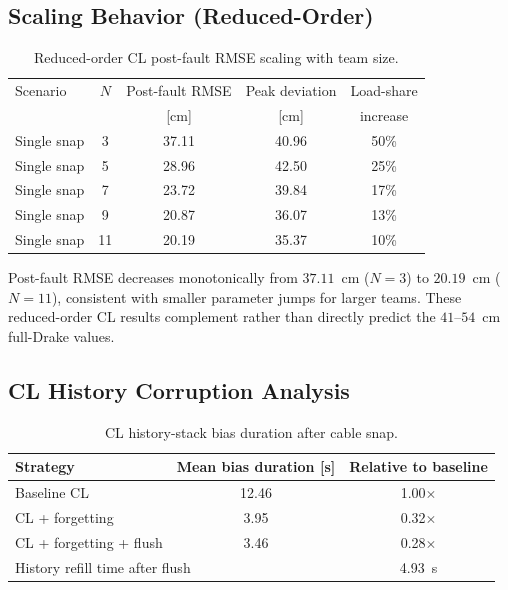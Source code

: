 
\subsection{Scaling Behavior (Reduced-Order)}
\label{supp:scaling}

\begin{table}[t]
\centering
\caption{Reduced-order CL post-fault RMSE scaling with team size.}
\label{tab:scaling}
\begin{tabular}{lcccc}
\toprule
Scenario & $N$ & Post-fault RMSE & Peak deviation & Load-share \\
         &     & [cm]            & [cm]           & increase   \\
\midrule
Single snap & 3  & 37.11 & 40.96 & 50\% \\
Single snap & 5  & 28.96 & 42.50 & 25\% \\
Single snap & 7  & 23.72 & 39.84 & 17\% \\
Single snap & 9  & 20.87 & 36.07 & 13\% \\
Single snap & 11 & 20.19 & 35.37 & 10\% \\
\bottomrule
\end{tabular}
\end{table}

Post-fault RMSE decreases monotonically from $37.11$~cm ($N{=}3$) to $20.19$~cm ($N{=}11$), consistent with smaller parameter jumps for larger teams. These reduced-order CL results complement rather than directly predict the $41$--$54$~cm full-Drake values.

\subsection{CL History Corruption Analysis}
\label{supp:cl_corruption}

\begin{table}[t]
\centering
\caption{CL history-stack bias duration after cable snap.}
\label{tab:cl_corruption}
\begin{tabular}{lcc}
\toprule
Strategy & Mean bias duration [s] & Relative to baseline \\
\midrule
Baseline CL              & 12.46 & 1.00$\times$ \\
CL + forgetting          & 3.95  & 0.32$\times$ \\
CL + forgetting + flush  & 3.46  & 0.28$\times$ \\
\midrule
\multicolumn{2}{l}{History refill time after flush} & 4.93~s \\
\bottomrule
\end{tabular}
\end{table}

